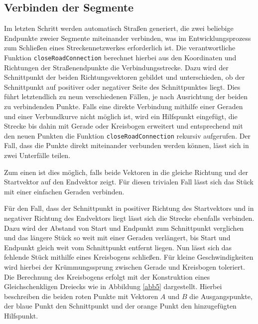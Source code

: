 \subsection{Verbinden der Segmente}

Im letzten Schritt werden automatisch Straßen generiert, die zwei beliebige Endpunkte zweier Segmente miteinander verbinden, was im Entwicklungsprozess zum Schließen eines Streckennetzwerkes erforderlich ist. Die verantwortliche Funktion \texttt{closeRoadConnection} berechnet hierbei aus den Koordinaten und Richtungen der Straßenendpunkte die Verbindungsstrecke. Dazu wird der Schnittpunkt der beiden Richtungsvektoren gebildet und unterschieden, ob der Schnittpunkt auf positiver oder negativer Seite des Schnittpunktes liegt. Dies führt letztendlich zu neun verschiedenen Fällen, je nach Ausrichtung der beiden zu verbindenden Punkte. Falls eine direkte Verbindung mithilfe einer Geraden und einer Verbundkurve nicht möglich ist, wird ein Hilfspunkt eingefügt, die Strecke bis dahin mit Gerade oder Kreisbogen erweitert und entsprechend mit den neuen Punkten die Funktion \texttt{closeRoadConnection} rekursiv aufgerufen. Der Fall, dass die Punkte direkt miteinander verbunden werden können, lässt sich in zwei Unterfälle teilen.

Zum einen ist dies möglich, falls beide Vektoren in die gleiche Richtung und der Startvektor auf den Endvektor zeigt. Für diesen trivialen Fall lässt sich das Stück mit einer einfachen Geraden verbinden.

Für den Fall, dass der Schnittpunkt in positiver Richtung des Startvektors und in negativer Richtung des Endvektors liegt lässt sich die Strecke ebenfalls verbinden. Dazu wird der Abstand von Start und Endpunkt zum Schnittpunkt verglichen und das längere Stück so weit mit einer Geraden verlängert, bis Start und Endpunkt gleich weit vom Schnittpunkt entfernt liegen. Nun lässt sich das fehlende Stück mithilfe eines Kreisbogens schließen. Für kleine Geschwindigkeiten wird hierbei der Krümmungssprung zwischen Gerade und Kreisbogen toleriert. Die Berechnung des Kreisbogens erfolgt mit der Konstruktion eines Gleichschenkligen Dreiecks wie in Abbildung \ref{abb5} dargestellt. Hierbei beschreiben die beiden roten Punkte mit Vektoren \(A\) und \(B\) die Ausgangspunkte, der blaue Punkt den Schnittpunkt und der orange Punkt den hinzugefügten Hilfspunkt.

